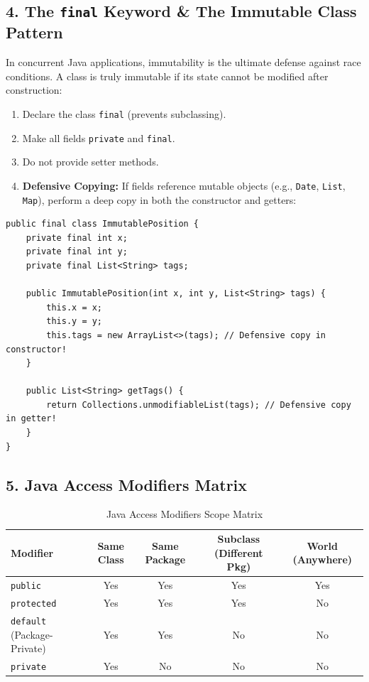\documentclass[10pt,journal,compsoc,onecolumn]{IEEEtran}
\begin{document}
\subsection{4. The \texttt{final} Keyword \& The Immutable Class Pattern}
In concurrent Java applications, immutability is the ultimate defense against race conditions. A class is truly immutable if its state cannot be modified after construction:
\begin{enumerate}
    \item Declare the class \texttt{final} (prevents subclassing).
    \item Make all fields \texttt{private} and \texttt{final}.
    \item Do not provide setter methods.
    \item \textbf{Defensive Copying:} If fields reference mutable objects (e.g., \texttt{Date}, \texttt{List}, \texttt{Map}), perform a deep copy in both the constructor and getters:
\end{enumerate}

\begin{verbatim}
public final class ImmutablePosition {
    private final int x;
    private final int y;
    private final List<String> tags;

    public ImmutablePosition(int x, int y, List<String> tags) {
        this.x = x;
        this.y = y;
        this.tags = new ArrayList<>(tags); // Defensive copy in constructor!
    }

    public List<String> getTags() {
        return Collections.unmodifiableList(tags); // Defensive copy in getter!
    }
}
\end{verbatim}

\subsection{5. Java Access Modifiers Matrix}
\begin{table}[htbp]
\caption{Java Access Modifiers Scope Matrix}
\label{tab:access_modifiers}
\centering
\begin{tabular}{lcccc}
\toprule
\textbf{Modifier} & \textbf{Same Class} & \textbf{Same Package} & \textbf{Subclass (Different Pkg)} & \textbf{World (Anywhere)} \\
\midrule
\texttt{public} & Yes & Yes & Yes & Yes \\
\texttt{protected} & Yes & Yes & Yes & No \\
\texttt{default} (Package-Private) & Yes & Yes & No & No \\
\texttt{private} & Yes & No & No & No \\
\bottomrule
\end{tabular}
\end{table}
\end{document}
